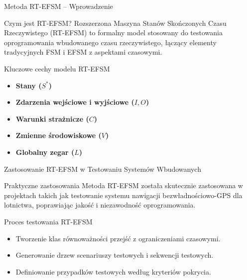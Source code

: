 \documentclass{beamer}
\begin{document}
\begin{frame}{Metoda RT-EFSM – Wprowadzenie}
  \begin{block}{Czym jest RT-EFSM?}
    Rozszerzona Maszyna Stanów Skończonych Czasu Rzeczywistego (RT-EFSM) to formalny model stosowany do testowania oprogramowania wbudowanego czasu rzeczywistego,
    łączący elementy tradycyjnych FSM i EFSM z aspektami czasowymi.
  \end{block}
  \begin{block}{Kluczowe cechy modelu RT-EFSM}
    \begin{itemize}
      \item \textbf{Stany (\(S^*\))}
      \item \textbf{Zdarzenia wejściowe i wyjściowe (\(I, O\))}
      \item \textbf{Warunki strażnicze (\(C\))}
      \item \textbf{Zmienne środowiskowe (\(V\))}
      \item \textbf{Globalny zegar (\(L\))}
    \end{itemize}
  \end{block}
\end{frame}

\begin{frame}{Zastosowanie RT-EFSM w Testowaniu Systemów Wbudowanych}
  \begin{block}{Praktyczne zastosowania}
    Metoda RT-EFSM została skutecznie zastosowana w projektach takich jak testowanie systemu nawigacji bezwładnościowo-GPS dla lotnictwa,
    poprawiając jakość i niezawodność oprogramowania.
  \end{block}

  \begin{block}{Proces testowania RT-EFSM}
    \begin{itemize}
      \item Tworzenie klas równoważności przejść z ograniczeniami czasowymi.
      \item Generowanie drzew scenariuszy testowych i sekwencji testowych.
      \item Definiowanie przypadków testowych według kryteriów pokrycia.
    \end{itemize}
  \end{block}
\end{frame}
\end{document}
